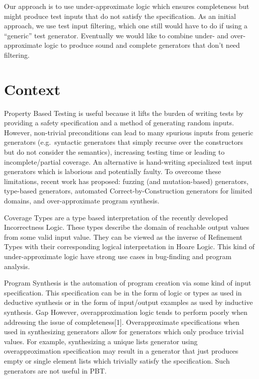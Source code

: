 \documentclass[review, sigplan]{acmart}
\begin{document}
Our approach is to use under-approximate logic which ensures completeness but might produce test inputs that do not satisfy the specification. As an initial approach, we use test input filtering, which one still would have to do if using a ``generic'' test generator. Eventually we would like to combine under- and over-approximate logic to produce sound and complete generators that don't need filtering.

\section{Context}

Property Based Testing is useful because it lifts the burden of writing tests by providing a safety specification and a method of generating random inputs. However, non-trivial preconditions can lead to many spurious inputs from generic generators (e.g.~syntactic generators that simply recurse over the constructors but do not consider the semantics), increasing testing time or leading to incomplete/partial coverage. An alternative is hand-writing specialized test input generators which is laborious and potentially faulty. To overcome these limitations, recent work has proposed: fuzzing (and mutation-based) generators, type-based generators, automated Correct-by-Construction generators for limited domains, and over-approximate program synthesis.

Coverage Types\cite{Poirot} are a type based interpretation of the recently developed Incorrectness Logic. These types describe the domain of reachable output values from some valid input value. They can be viewed as the inverse of Refinement Types with their corresponding logical interpretation in Hoare Logic. This kind of under-approximate logic have strong use cases in bug-finding and program analysis.

Program Synthesis is the automation of program creation via some kind of input specification. This specification can be in the form of logic or types as used in deductive synthesis or in the form of input/output examples as used by inductive synthesis.
Gap
However, overapproximation logic tends to perform poorly when addressing the issue of completeness[1]. Overapproximate specifications when used in synthesizing generators allow for generators which only produce trivial values. For example, synthesizing a unique lists generator using overapproximation specification may result in a generator that just produces empty or single element lists which trivially satisfy the specification. Such generators are not useful in PBT.
\end{document}
